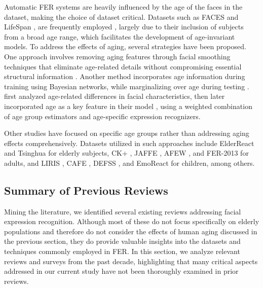         Automatic FER systems are heavily influenced by the age of the faces in the dataset, making the choice of dataset critical. Datasets such as FACES \citep{ebner2010faces} and LifeSpan \citep{minear2004lifespan}, are frequently employed \citep{guo2013facial, mary2016review, wu2015enhanced, wang2015facial, al_garaawi2016study, lopes2018facial, battinisonmez2019computational, caroppo2017facial, caroppo2019facial, caroppo2020comparison, al_garaawi2022fully}, largely due to their inclusion of subjects from a broad age range, which facilitates the development of age-invariant models. To address the effects of aging, several strategies have been proposed. One approach involves removing aging features through facial smoothing techniques that eliminate age-related details without compromising essential structural information \citep{guo2013facial, mary2016review}. Another method incorporates age information during training using Bayesian networks, while marginalizing over age during testing \citep{wu2015enhanced, wang2015facial}. \cite{al_garaawi2016study} first analyzed age-related differences in facial characteristics, then later incorporated age as a key feature in their model \citep{al_garaawi2022fully}, using a weighted combination of age group estimators and age-specific expression recognizers. 
        
        Other studies have focused on specific age groups rather than addressing aging effects comprehensively. Datasets utilized in such approaches include ElderReact \citep{ma2019elderreact} and Tsinghua \citep{yang2020tsinghua} for elderly subjects, CK+ \citep{lucey2010extended}, JAFFE \citep{lyons2020coding}, AFEW \citep{dhall2007collecting}, and FER-2013 \citep{goodfellow2013challenges} for adults, and LIRIS \citep{khan2019novel}, CAFE \citep{lobue2014child}, DEFSS \citep{meuwissen2017creation}, and EmoReact \citep{nojavanasghari2016emoreact} for children, among others.
        
    
    \subsection{Summary of Previous Reviews}
        
        Mining the literature, we identified several existing reviews addressing facial expression recognition. Although most of these do not focus specifically on elderly populations and therefore do not consider the effects of human aging discussed in the previous section, they do provide valuable insights into the datasets and techniques commonly employed in FER. In this section, we analyze relevant reviews and surveys from the past decade, highlighting that many critical aspects addressed in our current study have not been thoroughly examined in prior reviews.
    
